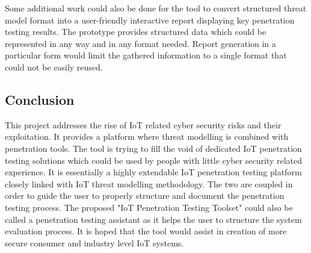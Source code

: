 	Some additional work could also be done for the tool to convert structured threat model format into a user-friendly interactive report displaying key penetration testing results. The prototype provides structured data which could be represented in any way and in any format needed. Report generation in a particular form would limit the gathered information to a single format that could not be easily reused. 
	
	\subsection{Conclusion}
	This project addresses the rise of IoT related cyber security risks and their exploitation. It provides a platform where threat modelling is combined with penetration tools. The tool is trying to fill the void of dedicated IoT penetration testing solutions which could be used by people with little cyber security related experience. It is essentially a highly extendable IoT penetration testing platform closely linked with IoT threat modelling methodology. The two are coupled in order to guide the user to properly structure and document the penetration testing process. The proposed "IoT Penetration Testing Toolset" could also be called a penetration testing assistant as it helps the user to structure the system evaluation process. It is hoped that the tool would assist in creation of more secure consumer and industry level IoT systems.
